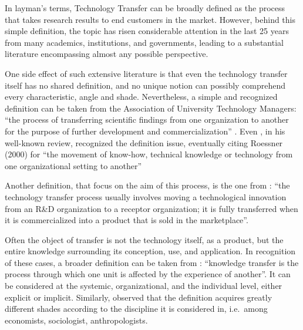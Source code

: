 

\label{Chapter1} %


In layman's terms, Technology Transfer can be broadly defined as the process that takes research results to end customers in the market. However, behind this simple definition, the topic has risen considerable attention in the last 25 years from many academics, institutions, and governments, leading to a substantial literature encompassing almost any possible perspective.

One side effect of such extensive literature is that even the technology transfer itself has no shared definition, and no unique notion can possibly comprehend every characteristic, angle and shade. Nevertheless, a simple and recognized definition can be taken from the Association of University Technology Managers: \enquote{the process of transferring scientific findings from one organization to another for the purpose of further development and commercialization} \citep{Genshaft2016}. Even \citet{Bozeman2000}, in his well-known review, recognized the definition issue, eventually citing Roessner (2000) for \enquote{the movement of know-how, technical knowledge or technology from one organizational setting to another}

Another definition, that focus on the aim of this process, is the one from \citet{Rogers2001}: \enquote{the technology transfer process usually involves moving a technological innovation from an R\&D organization to a receptor organization; it is fully transferred when it is commercialized into a product that is sold in the marketplace}. 

Often the object of transfer is not the technology itself, as a product, but the entire knowledge surrounding its conception, use, and application. In recognition of these cases, a broader definition can be taken from \citet{Argote2000}: \enquote{knowledge transfer is the process through which one unit is affected by the experience of another}. It can be considered at the systemic, organizational, and the individual level, either explicit or implicit. Similarly, \citet{Zhao1992} observed that the definition acquires greatly different shades according to the discipline it is considered in, i.e.\ among economists, sociologist, anthropologists. 

